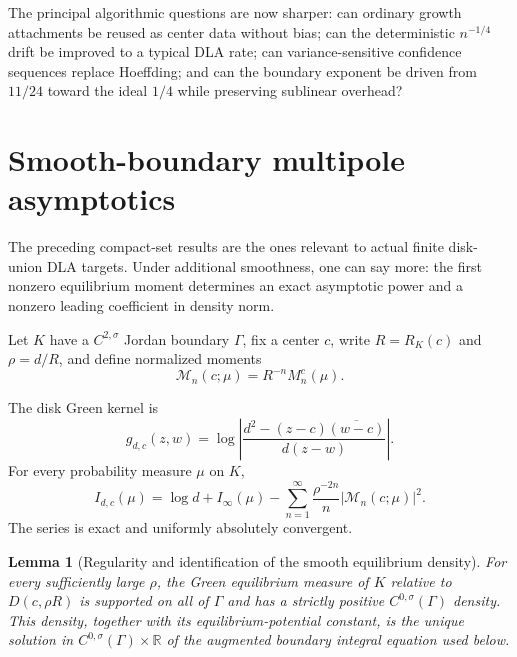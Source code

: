\documentclass[11pt]{article}
\theoremstyle{mainthm}
\newtheorem{lemma}[lemma]{Lemma}
\theoremstyle{definition}
\theoremstyle{remark}
\begin{document}
The principal algorithmic questions are now sharper: can ordinary growth attachments be reused as center data without bias; can the deterministic $n^{-1/4}$ drift be improved to a typical DLA rate; can variance-sensitive confidence sequences replace Hoeffding; and can the boundary exponent be driven from $11/24$ toward the ideal $1/4$ while preserving sublinear overhead?

\section{Smooth-boundary multipole asymptotics}
\label{sec:smooth-asymptotics}

The preceding compact-set results are the ones relevant to actual finite disk-union DLA targets. Under additional smoothness, one can say more: the first nonzero equilibrium moment determines an exact asymptotic power and a nonzero leading coefficient in density norm.

Let $K$ have a $C^{2,\sigma}$ Jordan boundary $\Gamma$, fix a center $c$, write $R=R_K(c)$ and $\rho=d/R$, and define normalized moments
\[
  \mathcal M_n(c;\mu)=R^{-n}M_n^c(\mu).
\]

The disk Green kernel is
\begin{equation}
  g_{d,c}(z,w)=
  \log\left|
  \frac{d^2-(z-c)\overline{(w-c)}}{d(z-w)}
  \right|.
  \label{eq:disk-green}
\end{equation}
For every probability measure $\mu$ on $K$,
\begin{equation}
  I_{d,c}(\mu)
  =\log d+I_\infty(\mu)
  -\sum_{n=1}^{\infty}
   \frac{\rho^{-2n}}{n}
   |\mathcal M_n(c;\mu)|^2.
  \label{eq:energy-expansion}
\end{equation}
The series is exact and uniformly absolutely convergent.

\begin{lemma}[Regularity and identification of the smooth equilibrium density]
\label{lem:smooth-density}
For every sufficiently large $\rho$, the Green equilibrium measure of $K$ relative to $D(c,\rho R)$ is supported on all of $\Gamma$ and has a strictly positive $C^{0,\sigma}(\Gamma)$ density. This density, together with its equilibrium-potential constant, is the unique solution in $C^{0,\sigma}(\Gamma)\times\mathbb R$ of the augmented boundary integral equation used below.
\end{lemma}
\end{document}
